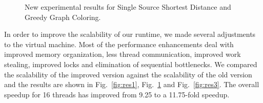 \documentclass[10pt]{article}
\begin{document}
\begin{figure}[h]
\begin{center}
\end{center}
\caption{New experimental results for Single Source Shortest Distance and Greedy Graph Coloring.}
\label{fig:res2}
\end{figure}

In order to improve the scalability of our runtime, we made several adjustments
to the virtual machine. Most of the performance enhancements deal with improved
memory organization, less thread communication, improved work stealing, improved
locks and elimination of sequential bottlenecks. We compared the scalability of the
improved version against the scalability of the old version and the results are
shown in Fig.~\ref{fig:res1}, Fig.~\ref{fig:res2} and Fig.~\ref{fig:res3}. The
overall speedup for 16 threads has improved from 9.25 to a 11.75-fold speedup.
\end{document}

